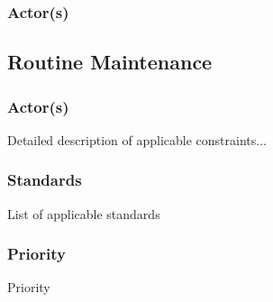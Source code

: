 \subsubsection{Actor(s)}
\subsection{Routine Maintenance}


\subsubsection{Actor(s)}

Detailed description of applicable constraints...
\subsubsection{Standards}
List of applicable standards
\subsubsection{Priority}
Priority
